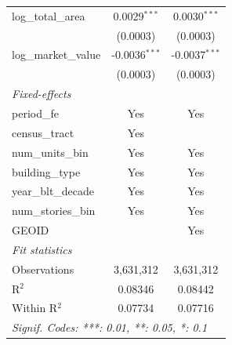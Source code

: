 \begin{tabular}{lcc}
   log\_total\_area                                      & 0.0029$^{***}$          & 0.0030$^{***}$\\   
                                                         & (0.0003)                & (0.0003)\\   
   log\_market\_value                                    & -0.0036$^{***}$         & -0.0037$^{***}$\\   
                                                         & (0.0003)                & (0.0003)\\   
   \midrule
   \emph{Fixed-effects}\\
   period\_fe                                            & Yes                     & Yes\\  
   census\_tract                                         & Yes                     & \\  
   num\_units\_bin                                       & Yes                     & Yes\\  
   building\_type                                        & Yes                     & Yes\\  
   year\_blt\_decade                                     & Yes                     & Yes\\  
   num\_stories\_bin                                     & Yes                     & Yes\\  
   GEOID                                                 &                         & Yes\\  
   \midrule
   \emph{Fit statistics}\\
   Observations                                          & 3,631,312               & 3,631,312\\  
   R$^2$                                                 & 0.08346                 & 0.08442\\  
   Within R$^2$                                          & 0.07734                 & 0.07716\\  
   \midrule \midrule
   \multicolumn{3}{l}{\emph{Signif. Codes: ***: 0.01, **: 0.05, *: 0.1}}\\
\end{tabular}
\par\endgroup
